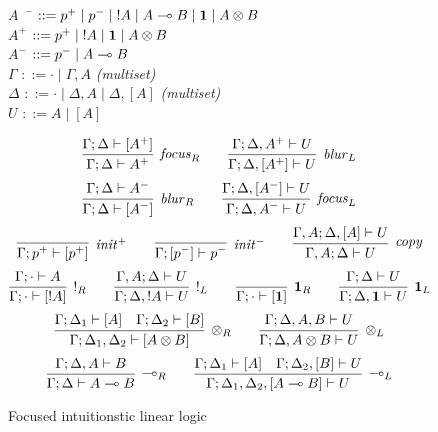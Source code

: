 \begin{figure}[t]
\begin{tabbing}
\quad $A$ \,\, \= $::= p^+ \mid p^- \mid {!}A \mid A \multimap B \mid \mathbf{1} \mid A \otimes B$\\
\quad $A^+$ \> $::= p^+ \mid {!}A \mid \mathbf{1} \mid A \otimes B$\\
\quad $A^-$ \> $::= p^- \mid A \multimap B$\\
\quad $\Gamma$ \> $::= \cdot \mid \Gamma, A$ \qquad\qquad \= {\it (multiset)}\\
\quad $\Delta$ \> $::= \cdot \mid \Delta, A \mid \Delta, [A]$ \> {\it (multiset)}\\
\quad $U$ \> $::= A \mid [ A ]$\\
\end{tabbing}
%
%
\quad {}
\[
\infer[{\it focus}_R]
{\mildseq{\Gamma}{\Delta}{A^+}}
{\mildseq{\Gamma}{\Delta}{[A^+]}}
\qquad
\infer[{\it blur}_L]
{\mildseq{\Gamma}{\Delta, [A^+]}{U}}
{\mildseq{\Gamma}{\Delta, A^+}{U}}
\]
\[
\infer[{\it blur}_R]
{\mildseq{\Gamma}{\Delta}{[A^-]}}
{\mildseq{\Gamma}{\Delta}{A^-}}
\qquad
\infer[{\it focus}_L]
{\mildseq{\Gamma}{\Delta,A^-}{U}}
{\mildseq{\Gamma}{\Delta,[A^-]}{U}}
\]
\[
\infer[{\it init}^+]
{\mildseq{\Gamma}{p^+}{[p^+]}}
{}
\qquad
\infer[{\it init}^-]
{\mildseq{\Gamma}{[p^-]}{p^-}}
{}
\qquad
\infer[{\it copy}]
{\mildseq{\Gamma, A}{\Delta}{U}}
{\mildseq{\Gamma, A}{\Delta, [A]}{U}}
%
\]\[
%
\infer[{!}_R]
{\mildseq{\Gamma}{\cdot}{[{!}A]}}
{\mildseq{\Gamma}{\cdot}{A}}
\qquad
\infer[{!}_L]
{\mildseq{\Gamma}{\Delta, {!}A}{U}}
{\mildseq{\Gamma, A}{\Delta}{U}}
\qquad
\infer[\one_R]
{\mildseq{\Gamma}{\cdot}{[\one]}}
{}
\qquad
\infer[\one_L]
{\mildseq{\Gamma}{\Delta, \one}{U}}
{\mildseq{\Gamma}{\Delta}{U}}
\]\[
%
\infer[{\tensor}_R]
{\mildseq{\Gamma}{\Delta_1,\Delta_2}{[A \tensor B]}}
{\mildseq{\Gamma}{\Delta_1}{[A]}
 &
 \mildseq{\Gamma}{\Delta_2}{[B]}}
\qquad
\infer[{\tensor}_L]
{\mildseq{\Gamma}{\Delta, A \tensor B}{U}}
{\mildseq{\Gamma}{\Delta, A, B}{U}}
\]\[
%
\infer[{\lolli}_R]
{\mildseq{\Gamma}{\Delta}{A \lolli B}}
{\mildseq{\Gamma}{\Delta, A}{B}}
\qquad
\infer[{\lolli}_L]
{\mildseq{\Gamma}{\Delta_1,\Delta_2, [A \lolli B]}{U}}
{\mildseq{\Gamma}{\Delta_1}{[A]}
 &
 \mildseq{\Gamma}{\Delta_2, [B]}{U}}
%
\]
\caption{Focused intuitionstic linear logic}
\label{fig:kaustuv-focused}
\end{figure}
